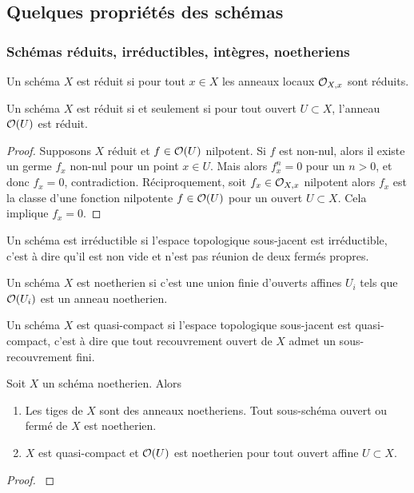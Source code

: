 \subsection{Quelques propriétés des schémas}

\subsubsection{Schémas réduits, irréductibles, intègres, noetheriens}

\begin{defn}
Un schéma $X$ est réduit si pour tout $x\in X$ les anneaux locaux $\mathcal{O}_{X,x}$ sont réduits. 
\end{defn}

\begin{prop}
Un schéma $X$ est réduit si et seulement si pour tout ouvert $U\subset X$, l'anneau $\mathcal{O}(U)$ est réduit.
\end{prop}
\begin{proof}
Supposons $X$ réduit et $f\in \mathcal{O}(U)$ nilpotent. Si $f$ est non-nul, alors il existe un germe $f_x$ non-nul pour un point $x\in U$. Mais alors $f_x^n=0$ pour un $n>0$, et donc $f_x=0$, contradiction.
Réciproquement, soit $f_x\in \mathcal{O}_{X,x}$ nilpotent alors $f_x$ est la classe d'une fonction nilpotente $f\in \mathcal{O}(U)$ pour un ouvert $U\subset X$. Cela implique $f_x=0$.
\end{proof}

\begin{defn}
Un schéma est irréductible si l'espace topologique sous-jacent est irréductible, c'est à dire qu'il est non vide et n'est pas réunion de deux fermés propres.
\end{defn}

\begin{defn}
Un schéma $X$ est noetherien si c'est une union finie d'ouverts affines $U_i$ tels que $\mathcal{O}(U_i)$ est un anneau noetherien.
\end{defn}

\begin{defn}
Un schéma $X$ est quasi-compact si l'espace topologique sous-jacent est quasi-compact, c'est à dire que tout recouvrement ouvert de $X$ admet un sous-recouvrement fini. 
\end{defn}

\begin{prop}
Soit $X$ un schéma noetherien. Alors 
\begin{enumerate}
\item Les tiges de $X$ sont des anneaux noetheriens. Tout sous-schéma ouvert ou fermé de $X$ est noetherien.
\item $X$ est quasi-compact et $\mathcal{O}(U)$ est noetherien pour tout ouvert affine $U\subset X$.
\end{enumerate}
\end{prop}
\begin{proof}
\cite[2.3.46]{QingLiu} 
\end{proof}


